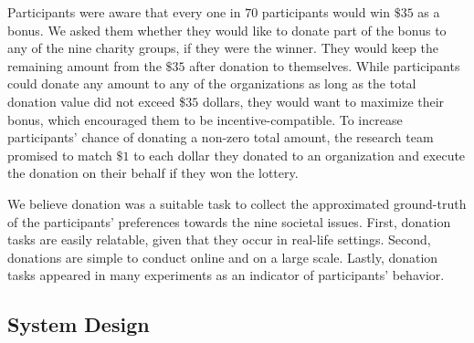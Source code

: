 Participants were aware that every one in $70$ participants would win $\$35$ as a bonus. We asked them whether they would like to donate part of the bonus to any of the nine charity groups, if they were the winner. They would keep the remaining amount from the $\$35$ after donation to themselves. While participants could donate any amount to any of the organizations as long as the total donation value did not exceed \$$35$ dollars, they would want to maximize their bonus, which encouraged them to be incentive-compatible. To increase participants' chance of donating a non-zero total amount, the research team promised to match $\$1$ to each dollar they donated to an organization and execute the donation on their behalf if they won the lottery. 


We believe donation was a suitable task to collect the approximated ground-truth of the participants' preferences towards the nine societal issues. First, donation tasks are easily relatable, given that they occur in real-life settings. Second, donations are simple to conduct online and on a large scale. Lastly, donation tasks appeared in many experiments \cite{Xiao2019, benz2008people, gendall2010effect} as an indicator of participants' behavior. 



\subsection{System Design}

